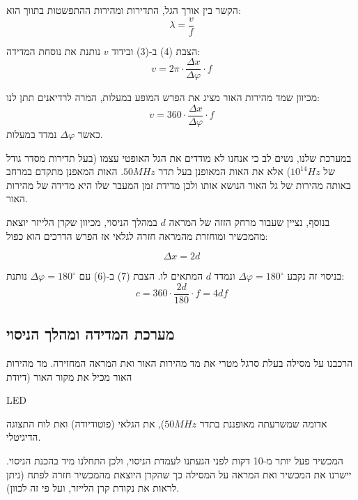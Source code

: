 \documentclass[14pt]{extarticle}
\begin{document}
הקשר בין אורך הגל, התדירות ומהירות ההתפשטות בתווך הוא:
\begin{equation}
    \lambda = \frac{v}{f}
\end{equation}

הצבת (4) ב-(3) ובידוד $v$ נותנת את נוסחת המדידה:
\begin{equation}
    v = 2\pi \cdot \frac{\Delta x}{\Delta \varphi} \cdot f
\end{equation}

מכיוון שמד מהירות האור מציג את הפרש המופע במעלות, המרה לרדיאנים תתן לנו:
\begin{equation}
    v = 360 \cdot \frac{\Delta x}{\Delta \varphi} \cdot f
\end{equation}
כאשר $\Delta \varphi$ נמדד במעלות.

במערכת שלנו, נשים לב כי אנחנו לא מודדים את הגל האופטי עצמו (בעל תדירות מסדר גודל של $10^14 Hz$)
אלא את האות המאופנן בעל תדר $50 MHz$.
האות המאפנן מתקדם במרחב באותה מהירות של גל האור הנושא אותו ולכן מדידת זמן המעבר שלו היא מדידה של מהירות האור.

בנוסף, נציין שעבור מרחק הזזה של המראה $d$ במהלך הניסוי, מכיוון שקרן הלייזר יוצאת מהמכשיר ומוחזרת מהמראה חזרה לגלאי
אז הפרש הדרכים הוא כפול:

\begin{equation}
    \Delta x = 2d
\end{equation}

בניסוי זה נקבע $\Delta \varphi = 180^\circ$ ונמדד $d$ המתאים לו. הצבת (7) ב-(6) עם $\Delta \varphi = 180^\circ$ נותנת:
\begin{equation}
    c = 360 \cdot \frac{2d}{180} \cdot f = 4 d f
\end{equation}

\subsection*{מערכת המדידה ומהלך הניסוי}

הרכבנו על מסילה בעלת סרגל מטרי את מד מהירות האור ואת המראה המחזירה.
מד מהירות האור מכיל את מקור האור (דיודת \begin{english}LED\end{english} אדומה שמשרעתה מאופננת בתדר $50MHz$),
את הגלאי (פוטודיודה) ואת לוח התצוגה הדיגיטלי.

המכשיר פעל יותר מ-10 דקות לפני הגעתנו לעמדת הניסוי, ולכן התחלנו מיד בהכנת הניסוי.
יישרנו את המכשיר ואת המראה על המסילה כך שהקרן היוצאת מהמכשיר חזרה לפתח (ניתן לראות את נקודת קרן הלייזר, ועל פי זה לכוון).
\end{document}
